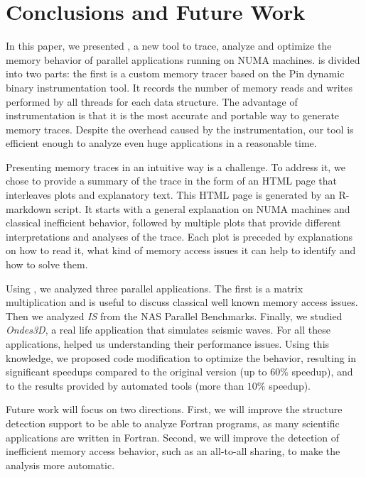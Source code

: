 
\section{Conclusions and Future Work}
\label{sec:concl}

In this paper, we presented \TABARNAC, a new tool to trace, analyze and
optimize the memory behavior of parallel applications running on NUMA
machines. \TABARNAC is divided into two parts: the first is a custom memory tracer
based on the Pin dynamic binary instrumentation tool. It records the
number of memory reads and writes performed by all threads for each data structure.
The advantage of instrumentation is that it is the most
accurate and portable way to generate memory traces.
Despite the overhead caused by the instrumentation, our tool is efficient enough to analyze even huge applications in a reasonable time.

Presenting memory traces in an intuitive way is a challenge. To address it, we
chose to provide a summary of the trace in the form of an HTML page that
interleaves plots and explanatory text. This HTML page is generated by an R-markdown
script. It starts with a general explanation on NUMA machines and classical
inefficient behavior, followed by multiple plots that provide different
interpretations and analyses of the trace. Each plot is preceded by explanations on how to
read it, what kind of memory access issues it can help to identify and how to solve them.

Using \TABARNAC, we analyzed three parallel applications. The first is a
matrix multiplication and is useful to discuss classical well known memory access issues.
Then we analyzed \emph{IS} from the NAS Parallel Benchmarks. Finally, we studied
\emph{Ondes3D}, a real life application that simulates seismic waves. For all
these applications, \TABARNAC helped us understanding their performance issues.
Using this knowledge, we proposed code modification to optimize the behavior, resulting in
significant speedups compared to the original version (up to $60\%$ speedup),
and to the results provided by automated tools (more than $10\%$ speedup).

Future work will focus on two directions. First, we will improve the
structure detection support to be able to analyze Fortran programs, as many
scientific applications are written in Fortran. Second, we will improve the
detection of inefficient memory access behavior, such as an all-to-all
sharing, to make the analysis more automatic.
